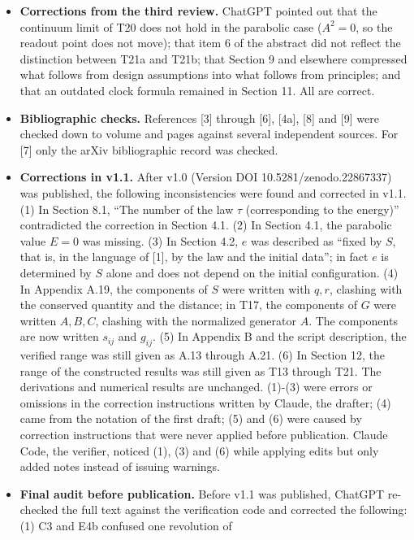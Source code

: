 \documentclass[
  a4paper,
]{article}
\begin{document}
\begin{itemize}
  T20.
\item
  \textbf{Corrections from the third review.} ChatGPT pointed out that
  the continuum limit of T20 does not hold in the parabolic case
  (\(A^2=0\), so the readout point does not move); that item 6 of the
  abstract did not reflect the distinction between T21a and T21b; that
  Section 9 and elsewhere compressed what follows from design
  assumptions into what follows from principles; and that an outdated
  clock formula remained in Section 11. All are correct.
\item
  \textbf{Bibliographic checks.} References {[}3{]} through {[}6{]},
  {[}4a{]}, {[}8{]} and {[}9{]} were checked down to volume and pages
  against several independent sources. For {[}7{]} only the arXiv
  bibliographic record was checked.
\item
  \textbf{Corrections in v1.1.} After v1.0 (Version DOI
  10.5281/zenodo.22867337) was published, the following inconsistencies
  were found and corrected in v1.1. (1) In Section 8.1, ``The number of
  the law \(\tau\) (corresponding to the energy)'' contradicted the
  correction in Section 4.1. (2) In Section 4.1, the parabolic value
  \(E=0\) was missing. (3) In Section 4.2, \(e\) was described as
  ``fixed by \(S\), that is, in the language of {[}1{]}, by the law and
  the initial data''; in fact \(e\) is determined by \(S\) alone and
  does not depend on the initial configuration. (4) In Appendix A.19,
  the components of \(S\) were written with \(q,r\), clashing with the
  conserved quantity and the distance; in T17, the components of \(G\)
  were written \(A,B,C\), clashing with the normalized generator \(A\).
  The components are now written \(s_{ij}\) and \(g_{ij}\). (5) In
  Appendix B and the script description, the verified range was still
  given as A.13 through A.21. (6) In Section 12, the range of the
  constructed results was still given as T13 through T21. The
  derivations and numerical results are unchanged. (1)-(3) were errors
  or omissions in the correction instructions written by Claude, the
  drafter; (4) came from the notation of the first draft; (5) and (6)
  were caused by correction instructions that were never applied before
  publication. Claude Code, the verifier, noticed (1), (3) and (6) while
  applying edits but only added notes instead of issuing warnings.
\item
  \textbf{Final audit before publication.} Before v1.1 was published,
  ChatGPT re-checked the full text against the verification code and
  corrected the following: (1) C3 and E4b confused one revolution of

\end{itemize}
\end{document}
